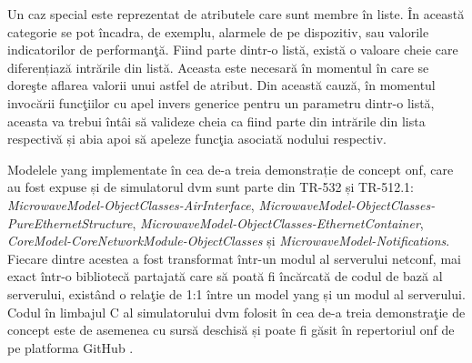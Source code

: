 Un caz special este reprezentat de atributele care sunt membre în liste. În această categorie se pot încadra, de exemplu, alarmele de pe dispozitiv, sau valorile indicatorilor de performanţă. Fiind parte dintr-o listă, există o valoare cheie care diferențiază intrările din listă. Aceasta este necesară în momentul în care se doreşte aflarea valorii unui astfel de atribut. Din această cauză, în momentul invocării funcţiilor cu apel invers generice pentru un parametru dintr-o listă, aceasta va trebui întâi să valideze cheia ca fiind parte din intrările din lista respectivă și abia apoi să apeleze funcţia asociată nodului respectiv.

Modelele \gls{yang} implementate în cea de-a treia demonstrație de concept \gls{onf}, care au fost expuse și de simulatorul \gls{dvm} sunt parte din TR-532 și TR-512.1: \textit{MicrowaveModel-ObjectClasses-AirInterface}, \textit{MicrowaveModel-ObjectClasses-PureEthernetStructure}, \textit{MicrowaveModel-ObjectClasses-EthernetContainer}, \textit{CoreModel-CoreNetworkModule-ObjectClasses} și \textit{MicrowaveModel-Notifications}. Fiecare dintre acestea a fost transformat într-un modul al serverului \gls{netconf}, mai exact într-o bibliotecă partajată care să poată fi încărcată de codul de bază al serverului, existând o relaţie de 1:1 între un model \gls{yang} și un modul al serverului. Codul în limbajul C al simulatorului \gls{dvm} folosit în cea de-a treia demonstraţie de concept este de asemenea cu sursă deschisă și poate fi găsit în repertoriul \gls{onf} de pe platforma GitHub \cite{dvmv02github}.

